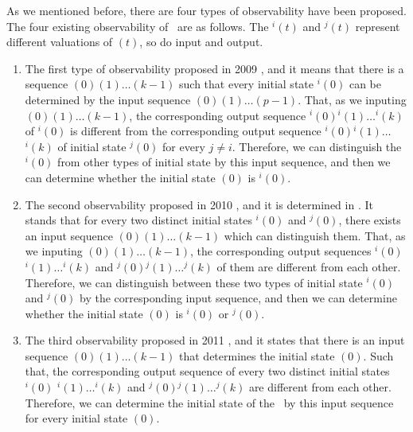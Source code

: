 As we mentioned before, there are four types of observability have been proposed. The four existing observability of \BCNs\ are as follows. The \State$^{i}(t)$ and \State$^{j}(t)$ represent different valuations of \State$(t)$, so do input and output. 


\begin{enumerate}
	\item The first type of observability proposed in 2009 \cite{cheng2009controllability}, and it means that there is a sequence \Input$(0)$\Input$(1)\ldots$\Input$(k-1)$
 such that
	every initial state \State$^{i}(0)$ can be determined by the input sequence \Input$(0)$\Input$(1)\ldots$\Input$(p-1)$. That, as we inputing \Input$(0)$\Input$(1)\ldots$\Input$(k-1)$, the corresponding output sequence \Output$^{i}(0)$\Output$^{i}(1)\ldots$\Output$^{i}(k)$ of \State$^{i}(0)$ is different from the corresponding output sequence \Output$^{i}(0)$\Output$^{i}(1)\ldots$\Output$^{i}(k)$ of initial state \State$^{j}(0)$ for every $j\ne i$. Therefore, we can distinguish the \State$^{i}(0)$ from other types of initial state by this input sequence, and then we can determine whether the initial state \State$(0)$ is \State$^{i}(0)$.
	\item 
	The second observability proposed in 2010 \cite{Zhao2010Input}, and it is determined in \cite{Li2015Controllability}. It stands that for every two distinct initial states \State$^{i}(0)$ and \State$^{j}(0)$, there exists an input sequence \Input$(0)$\Input$(1)\ldots$\Input$(k-1)$ which can distinguish them. That, as we inputing \Input$(0)$\Input$(1)\ldots$\Input$(k-1)$, the corresponding output sequences \Output$^{i}(0)$\Output$^{i}(1)\ldots$\Output$^{i}(k)$ and \Output$^{j}(0)$\Output$^{j}(1)\ldots$\Output$^{j}(k)$ of them are different from each other. Therefore, we can distinguish between these two types of initial state \State$^{i}(0)$ and \State$^{j}(0)$ by the corresponding input sequence, and then we can determine whether the initial state \State$(0)$ is \State$^{i}(0)$ or \State$^{j}(0)$.	
	\item The third observability proposed in 2011 \cite{Cheng2011Identification}, and it states that there is an input sequence \Input$(0)$\Input$(1)\ldots$\Input$(k-1)$ that determines the initial state \State$(0)$. Such that, the corresponding output sequence of every two distinct initial states \Output$^{i}(0)$ \Output$^{i}(1)\ldots$\Output$^{i}(k)$ and \Output$^{j}(0)$\Output$^{j}(1)\ldots$\Output$^{j}(k)$ are different from each other. Therefore, we can determine the initial state of the \BCN\ by this input sequence for every initial state \State$(0)$.
	

\end{enumerate}
